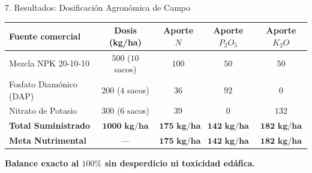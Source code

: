 \documentclass[
  spanish,
  aspectratio=169,
  xcolor={dvipsnames,table}
]{beamer}
\begin{document}
\begin{frame}{7. Resultados: Dosificación Agronómica de Campo}
  \begin{table}[htbp]
    \centering
    \small
    \begin{tabularx}{0.92\textwidth}{lcccc}
      \toprule
      \textbf{Fuente comercial} & \textbf{Dosis (kg/ha)} & \textbf{Aporte $N$} & \textbf{Aporte $P_2O_5$} & \textbf{Aporte $K_2O$} \\
      \midrule
      Mezcla NPK 20-10-10 & $500$ ($10$ sacos) & $100$ & $50$ & $50$ \\
      Fosfato Diamónico (DAP) & $200$ ($4$ sacos) & $36$ & $92$ & $0$ \\
      Nitrato de Potasio & $300$ ($6$ sacos) & $39$ & $0$ & $132$ \\
      \midrule
      \textbf{Total Suministrado} & $\mathbf{1000\text{ kg/ha}}$ & $\mathbf{175\text{ kg/ha}}$ & $\mathbf{142\text{ kg/ha}}$ & $\mathbf{182\text{ kg/ha}}$ \\
      \textbf{Meta Nutrimental} & --- & $\mathbf{175\text{ kg/ha}}$ & $\mathbf{142\text{ kg/ha}}$ & $\mathbf{182\text{ kg/ha}}$ \\
      \bottomrule
    \end{tabularx}
  \end{table}
  \begin{center}
    \textbf{\color{uanlblue}Balance exacto al $100\%$ sin desperdicio ni toxicidad edáfica.}
  \end{center}
\end{frame}
\end{document}
